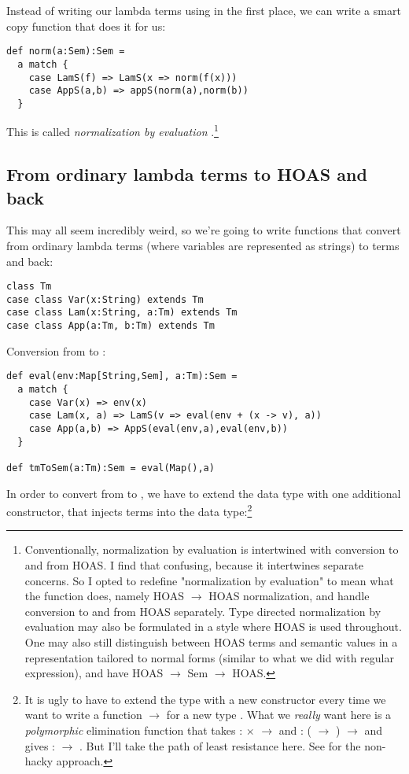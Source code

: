 Instead of writing our lambda terms using  in the first place, we can write a smart copy function that does it for us:

\begin{lstlisting}
def norm(a:Sem):Sem =
  a match {
    case LamS(f) => LamS(x => norm(f(x)))
    case AppS(a,b) => appS(norm(a),norm(b))
  }
\end{lstlisting}

This is called \emph{normalization by evaluation} \cite{berger91}.\footnote{Conventionally, normalization by evaluation is intertwined with conversion to and from HOAS. I find that confusing, because it intertwines separate concerns. So I opted to redefine "normalization by evaluation" to mean what the  function does, namely HOAS $\to$ HOAS normalization, and handle conversion to and from HOAS separately. Type directed normalization by evaluation may also be formulated in a style where HOAS is used throughout. One may also still distinguish between HOAS terms and semantic values in a representation tailored to normal forms (similar to what we did with regular expression), and have HOAS $\to$ Sem $\to$ HOAS.}

\subsection{From ordinary lambda terms to HOAS and back}

This may all seem incredibly weird, so we're going to write functions that convert from ordinary lambda terms (where variables are represented as strings) to  terms and back:

\begin{lstlisting}
class Tm
case class Var(x:String) extends Tm
case class Lam(x:String, a:Tm) extends Tm
case class App(a:Tm, b:Tm) extends Tm
\end{lstlisting}

Conversion from  to :

\begin{lstlisting}
def eval(env:Map[String,Sem], a:Tm):Sem =
  a match {
    case Var(x) => env(x)
    case Lam(x, a) => LamS(v => eval(env + (x -> v), a))
    case App(a,b) => AppS(eval(env,a),eval(env,b))
  }

def tmToSem(a:Tm):Sem = eval(Map(),a)
\end{lstlisting}

In order to convert from  to , we have to extend the  data type with one additional constructor, that injects  terms into the  data type:\footnote{
  It is ugly to have to extend the  type with a new constructor  every time we want to write a function  $\to$  for a new type .
  What we \emph{really} want here is a \emph{polymorphic} elimination function  that takes  :  $\times$  $\to$  and  : ( $\to$ ) $\to$  and gives  :  $\to$ .
  But I'll take the path of least resistance here. See \cite{BoxesGoBananas2003} for the non-hacky approach.
}

